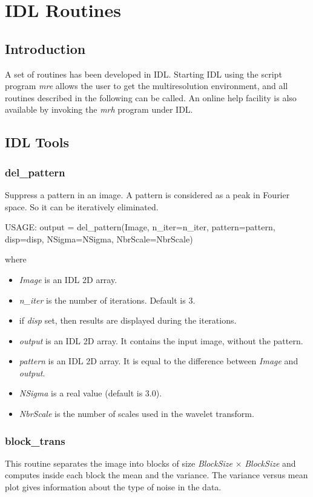 
\chapter{IDL Routines}
\label{ch_idl}

\section{Introduction}
A set of routines has been developed in IDL. Starting IDL using
the script program {\em mre} allows the user to get the multiresolution
environment, and all routines
described in the following can be called. An online help facility 
is also available by
invoking the {\em mrh} program under IDL.

\section{IDL Tools}
\subsection{del\_pattern}
\label{pat}
Suppress a pattern in an image. A pattern is considered as a peak in 
Fourier space. So it can be iteratively eliminated.
{\bf
\begin{center}
     USAGE: output = del\_pattern(Image, n\_iter=n\_iter, pattern=pattern, disp=disp, NSigma=NSigma, NbrScale=NbrScale)
\end{center}}
where
\begin{itemize}
\item {\em Image} is an IDL 2D array.
\item {\em n\_iter} is the number of iterations. Default is 3.
\item if {\em disp} set, then results are displayed during the iterations.
\item {\em output} is an IDL 2D array. It contains the input image, without
the pattern.
\item {\em pattern} is an IDL 2D array. It is equal to the difference between
{\em Image} and {\em output}.
\item {\em NSigma} is a real value (default is 3.0).
\item {\em NbrScale} is the number of scales used in the wavelet transform.
\end{itemize}


\subsection{block\_trans}
This routine separates the image into blocks of size {\em BlockSize} 
$\times$ {\em BlockSize}
and computes inside each block the mean and the variance. The 
variance versus mean plot gives information about the type of noise in
the data.
 
